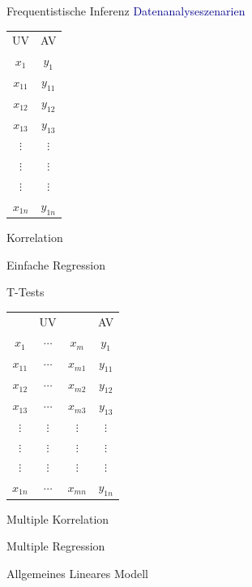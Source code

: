\documentclass[
  8pt,
  ignorenonframetext,
]{beamer}
\begin{document}
\begin{frame}{Frequentistische Inferenz}
\protect\hypertarget{frequentistische-inferenz-1}{}
\textcolor{darkblue}{Datenanalyseszenarien} \vspace{4mm}

\small
\begin{minipage}{0.5\linewidth}
\center
\begin{tabular}{c|c}
UV         & AV          \\
$x_1$      & $y_1$       \\\hline
$x_{11}$   & $y_{11}$    \\
$x_{12}$   & $y_{12}$    \\
$x_{13}$   & $y_{13}$    \\
$\vdots$   & $\vdots$    \\
$\vdots$   & $\vdots$    \\
$\vdots$   & $\vdots$    \\
$x_{1n}$   & $y_{1n}$    \\
\end{tabular}
\vspace{2mm}

Korrelation

Einfache Regression

T-Tests
\end{minipage}
\begin{minipage}{0.5\linewidth}
\center
\begin{tabular}{ccc|c}
          & UV        &          & AV          \\
$x_1$     & $\cdots$  & $x_m$    & $y_1$       \\\hline
$x_{11}$  & $\cdots$  & $x_{m1}$ & $y_{11}$    \\
$x_{12}$  & $\cdots$  & $x_{m2}$ & $y_{12}$    \\
$x_{13}$  & $\cdots$  & $x_{m3}$ & $y_{13}$    \\
$\vdots$  & $\vdots$  & $\vdots$ & $\vdots$    \\
$\vdots$  & $\vdots$  & $\vdots$ & $\vdots$    \\
$\vdots$  & $\vdots$  & $\vdots$ & $\vdots$    \\
$x_{1n}$  & $\cdots$  & $x_{mn}$ & $y_{1n}$    \\
\end{tabular}
\vspace{2mm}

Multiple Korrelation

Multiple Regression

Allgemeines Lineares Modell

\end{minipage}
\end{frame}
\end{document}
